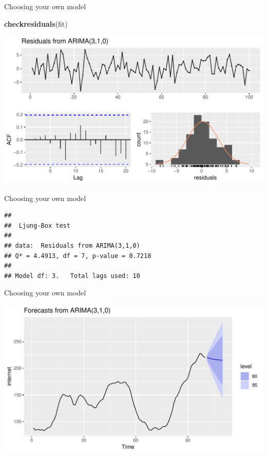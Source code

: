 \documentclass[14pt,ignorenonframetext,]{beamer}
\newenvironment{Shaded}{\begin{snugshade}}{\end{snugshade}}
\newcommand{\KeywordTok}[1]{\textcolor[rgb]{0.13,0.29,0.53}{\textbf{#1}}}
\newcommand{\StringTok}[1]{\textcolor[rgb]{0.31,0.60,0.02}{#1}}
\newcommand{\OperatorTok}[1]{\textcolor[rgb]{0.81,0.36,0.00}{\textbf{#1}}}
\newcommand{\NormalTok}[1]{#1}
\begin{document}
\begin{frame}[fragile]{Choosing your own model}

\begin{Shaded}
\begin{Highlighting}[]
\KeywordTok{checkresiduals}\NormalTok{(fit)}
\end{Highlighting}
\end{Shaded}

\includegraphics{week_5_arima_files/figure-beamer/unnamed-chunk-35-1.pdf}

\end{frame}

\begin{frame}[fragile]{Choosing your own model}

\begin{verbatim}
## 
##  Ljung-Box test
## 
## data:  Residuals from ARIMA(3,1,0)
## Q* = 4.4913, df = 7, p-value = 0.7218
## 
## Model df: 3.   Total lags used: 10
\end{verbatim}

\end{frame}

\begin{frame}[fragile]{Choosing your own model}

\begin{Shaded}
\end{Shaded}

\includegraphics{week_5_arima_files/figure-beamer/unnamed-chunk-37-1.pdf}

\end{frame}
\end{document}
